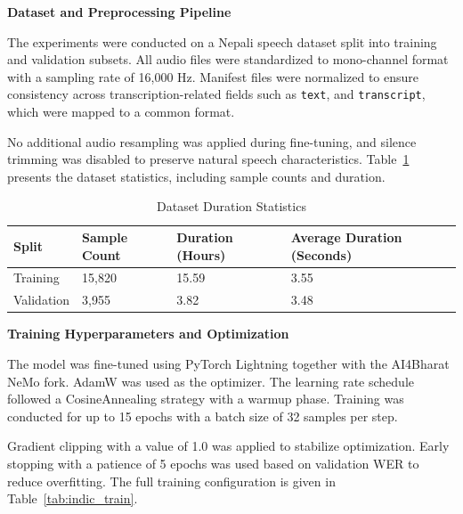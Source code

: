 \textbf{Dataset and Preprocessing Pipeline}

The experiments were conducted on a Nepali speech dataset split into training and validation subsets. All audio files were standardized to mono-channel format with a sampling rate of 16,000 Hz. Manifest files were normalized to ensure consistency across transcription-related fields such as \texttt{text}, and \texttt{transcript}, which were mapped to a common format.

No additional audio resampling was applied during fine-tuning, and silence trimming was disabled to preserve natural speech characteristics. Table~\ref{tab:indic_dataset} presents the dataset statistics, including sample counts and duration.

\begin{table}[H]
\caption{Dataset Duration Statistics}
\label{tab:indic_dataset}
\centering
\begin{tabular}{|l|l|l|l|}
\hline
\textbf{Split} & \textbf{Sample Count} & \textbf{Duration (Hours)} & \textbf{Average Duration (Seconds)} \\
\hline
Training & 15,820 & 15.59 & 3.55 \\
Validation & 3,955 & 3.82 & 3.48 \\
\hline
\end{tabular}
\end{table}

\textbf{Training Hyperparameters and Optimization}

The model was fine-tuned using PyTorch Lightning together with the AI4Bharat NeMo fork. AdamW was used as the optimizer. The learning rate schedule followed a CosineAnnealing strategy with a warmup phase. Training was conducted for up to 15 epochs with a batch size of 32 samples per step.

Gradient clipping with a value of 1.0 was applied to stabilize optimization. Early stopping with a patience of 5 epochs was used based on validation WER to reduce overfitting. The full training configuration is given in Table~\ref{tab:indic_train}.

